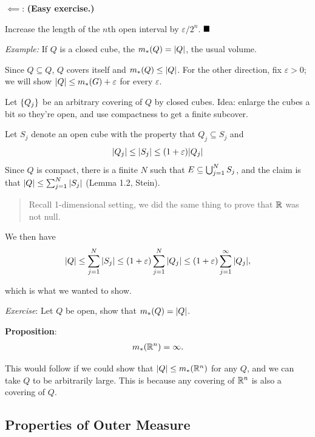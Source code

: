 \(\impliedby\): \textbf{(Easy exercise.)}

Increase the length of the \(n\)th open interval by
\(\varepsilon / 2^n\). \(\qed\)

\emph{Example:} If \(Q\) is a closed cube, the \(m_*(Q) = {\left\lvert {Q} \right\rvert}\), the
usual volume.

Since \(Q \subseteq Q\), \(Q\) covers itself and
\(m_*(Q) \leq {\left\lvert {Q} \right\rvert}\). For the other direction, fix
\(\varepsilon > 0\); we will show \({\left\lvert {Q} \right\rvert} \leq m_*(G) + \varepsilon\)
for every \(\varepsilon\).

Let \(\left\{{Q_j}\right\}\) be an arbitrary covering of \(Q\) by closed cubes.
Idea: enlarge the cubes a bit so they're open, and use compactness to
get a finite subcover.

Let \(S_j\) denote an open cube with the property that
\(Q_j \subseteq S_j\) and
\begin{align*}
{\left\lvert {Q_j} \right\rvert} \leq {\left\lvert {S_j} \right\rvert} \leq (1+\varepsilon){\left\lvert {Q_j} \right\rvert}
\end{align*} Since \(Q\) is compact, there is a finite \(N\) such that
\(E \subseteq \bigcup_{j=1}^N S_j\), and the claim is that
\({\left\lvert {Q} \right\rvert} \leq \sum_{j=1}^N {\left\lvert {S_j} \right\rvert}\) (Lemma 1.2, Stein).

\begin{quote}
Recall 1-dimensional setting, we did the same thing to prove that
\({\mathbb{R}}\) was not null.
\end{quote}

We then have
\begin{align*}
{\left\lvert {Q} \right\rvert} \leq \sum_{j=1}^N {\left\lvert {S_j} \right\rvert} \leq (1+\varepsilon) \sum_{j=1}^N {\left\lvert {Q_j} \right\rvert} \leq (1+\varepsilon) \sum_{j=1}^\infty {\left\lvert {Q_j} \right\rvert},
\end{align*}

which is what we wanted to show.

\emph{Exercise}: Let \(Q\) be open, show that \(m_*(Q) = {\left\lvert {Q} \right\rvert}\).

\textbf{Proposition}:
\begin{align*}
m_*({\mathbb{R}}^n) = \infty
.\end{align*}

This would follow if we could show that \({\left\lvert {Q} \right\rvert} \leq m_*({\mathbb{R}}^n)\) for
any \(Q\), and we can take \(Q\) to be arbitrarily large. This is
because any covering of \({\mathbb{R}}^n\) is also a covering of \(Q\).

\hypertarget{properties-of-outer-measure}{%
\subsection{Properties of Outer
Measure}\label{properties-of-outer-measure}}


